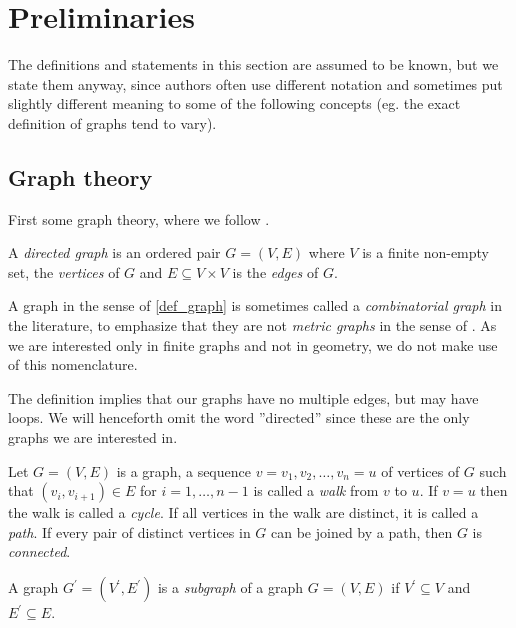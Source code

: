 \chapter{Preliminaries}
The definitions and statements in this section are assumed to be
known, but we state them anyway, since authors often use different
notation and sometimes put slightly different meaning to some of the
following concepts (eg. the exact definition of graphs tend to
vary). 

\section{Graph theory}
First some graph theory, where we follow \cite{biggs89}.

\begin{deff} \label{def_graph}
A \emph{directed graph} is an ordered pair $G = (V, E)$ where $V$ is a finite non-empty set, the \emph{vertices} of $G$ and $E \subseteq V \times V$ is the \emph{edges} of $G$.
\end{deff}
\begin{remark}
  A graph in the sense of \ref{def_graph} is sometimes called a
  \emph{combinatorial graph} in the literature, to emphasize that they
  are not \emph{metric graphs} in the sense of \cite{bridson99}. As we
  are interested only in finite graphs and not in geometry, we do not
  make use of this nomenclature.
\end{remark}

\begin{remark}
The definition implies that our graphs have no multiple edges, but may have loops. We will henceforth omit the word ''directed'' since these are the only
graphs we are interested in.
\end{remark}

\begin{deff} \label{def_graph_misc}
Let $G = (V, E)$ is a graph, a sequence $v = v_1, v_2, \dotsc, v_n =
  u$ of vertices of $G$ such that $(v_i, v_{i + 1}) \in E$ for $i = 1,
  \dotsc, n - 1$ is called a \emph{walk} from $v$ to $u$. If $v = u$
  then the walk is called a \emph{cycle}. If all vertices in the walk are
  distinct, it is called a \emph{path}. If every pair of distinct vertices in $G$ can be joined by a path, then $G$ is \emph{connected}.
\end{deff}

\begin{deff}
A graph $G^{\prime} = (V^{\prime}, E^{\prime})$ is a \emph{subgraph} of a graph $G = (V, E)$ if $V^{\prime} \subseteq V$ and $E^{\prime} \subseteq E$.
\end{deff}

